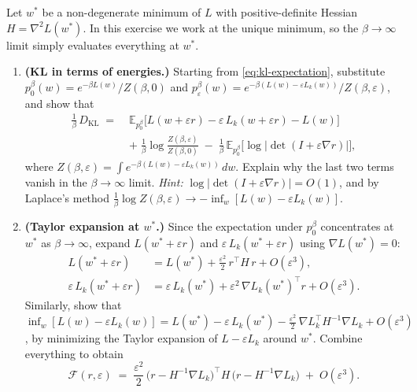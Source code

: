 \documentclass[11pt]{article}
\newcommand{\E}{\mathbb{E}}
\begin{document}
\begin{exercise}\label{ex:bif-ot}
Let $w^*$ be a non-degenerate minimum of $L$ with positive-definite Hessian $H = \nabla^2 L(w^*)$. In this exercise we work at the unique minimum, so the $\beta\to\infty$ limit simply evaluates everything at $w^*$.
\begin{enumerate}
  \item[(a)] \textbf{(KL in terms of energies.)} Starting from \eqref{eq:kl-expectation}, substitute $p_0^\beta(w) = e^{-\beta L(w)}/Z(\beta,0)$ and $p_\varepsilon^\beta(w) = e^{-\beta(L(w)-\varepsilon L_k(w))}/Z(\beta,\varepsilon)$, and show that
  \begin{align*}
    \frac{1}{\beta}\,D_{\mathrm{KL}} \;=\; &\E_{p_0^\beta}\!\bigl[L(w + \varepsilon r) - \varepsilon\,L_k(w + \varepsilon r) - L(w)\bigr] \\
    &+\; \frac{1}{\beta}\log\frac{Z(\beta,\varepsilon)}{Z(\beta,0)} \;-\; \frac{1}{\beta}\,\E_{p_0^\beta}\!\bigl[\log|\det(I + \varepsilon\nabla r)|\bigr],
  \end{align*}
  where $Z(\beta,\varepsilon) = \int e^{-\beta(L(w)-\varepsilon L_k(w))}\,dw$. Explain why the last two terms vanish in the $\beta\to\infty$ limit. \emph{Hint:} $\log|\det(I+\varepsilon\nabla r)| = O(1)$, and by Laplace's method $\tfrac{1}{\beta}\log Z(\beta,\varepsilon) \to -\inf_w[L(w) - \varepsilon L_k(w)]$.

  \item[(b)] \textbf{(Taylor expansion at $w^*$.)} Since the expectation under $p_0^\beta$ concentrates at $w^*$ as $\beta\to\infty$, expand $L(w^* + \varepsilon r)$ and $\varepsilon\,L_k(w^* + \varepsilon r)$ using $\nabla L(w^*) = 0$:
  \begin{align*}
    L(w^* + \varepsilon r) &= L(w^*) + \tfrac{\varepsilon^2}{2}\,r^\top H\,r + O(\varepsilon^3), \\
    \varepsilon\,L_k(w^* + \varepsilon r) &= \varepsilon\,L_k(w^*) + \varepsilon^2\,\nabla L_k(w^*)^\top r + O(\varepsilon^3).
  \end{align*}
  Similarly, show that $\inf_w[L(w) - \varepsilon L_k(w)] = L(w^*) - \varepsilon\,L_k(w^*) - \tfrac{\varepsilon^2}{2}\,\nabla L_k^\top H^{-1}\nabla L_k + O(\varepsilon^3)$, by minimizing the Taylor expansion of $L - \varepsilon L_k$ around $w^*$. Combine everything to obtain
  \begin{equation}\label{eq:ot-quadratic}
    \mathcal{F}(r,\varepsilon) \;=\; \frac{\varepsilon^2}{2}\,\bigl(r - H^{-1}\nabla L_k\bigr)^\top H\,\bigl(r - H^{-1}\nabla L_k\bigr) \;+\; O(\varepsilon^3).
  \end{equation}


\end{enumerate}
\end{exercise}
\end{document}
